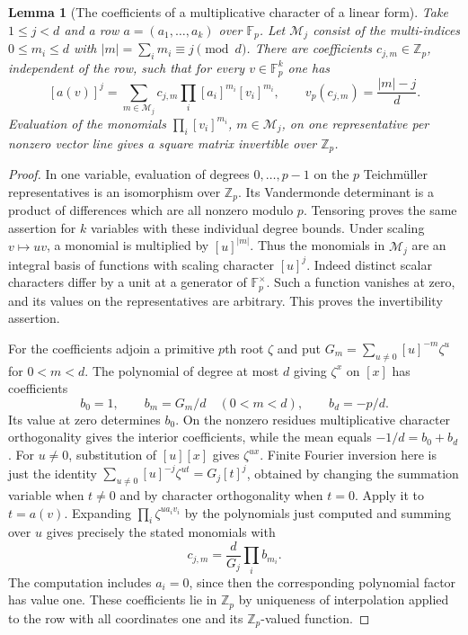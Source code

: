 \documentclass[a4paper,11pt]{article}
\newtheorem{lemma}[proposition]{Lemma}
\theoremstyle{definition}
\theoremstyle{remark}
\newcommand{\ZZ}{\mathbb Z}\newcommand{\ord}{\operatorname{ord}}
\numberwithin{equation}{section}
\begin{document}
\begin{lemma}[The coefficients of a multiplicative character of a linear form]\leavevmode
\label{lem:teichrow400}
Take \(1\le j<d\) and a row \(a=(a_1,\ldots,a_k)\) over
\(\mathbb F_p\). Let \(\mathcal M_j\) consist of the multi-indices
\(0\le m_i\le d\) with \(|m|=\sum_i m_i\equiv j\pmod d\).
There are coefficients \(c_{j,m}\in\ZZ_p\), independent of the row,
such that for every \(v\in\mathbb F_p^k\) one has
\[
    [a(v)]^j=\sum_{m\in\mathcal M_j}c_{j,m}
          \prod_i[a_i]^{m_i}[v_i]^{m_i},\qquad
    v_p(c_{j,m})=\frac{|m|-j}{d}.
\]
Evaluation of the monomials \(\prod_i[v_i]^{m_i}\),
\(m\in\mathcal M_j\), on one representative per nonzero vector
line gives a square matrix invertible over \(\ZZ_p\).
\end{lemma}
\begin{proof}
In one variable, evaluation of degrees \(0,\dots,p-1\) on the
\(p\) Teichm\"uller representatives is an isomorphism over
\(\ZZ_p\). Its Vandermonde determinant is a product of differences
which are all nonzero modulo \(p\). Tensoring proves the same
assertion for \(k\) variables with these individual degree bounds.
Under scaling \(v\mapsto u v\), a monomial is multiplied by
\([u]^{|m|}\). Thus the monomials in \(\mathcal M_j\) are an
integral basis of functions with scaling character \([u]^j\).
Indeed distinct scalar characters differ by a unit at a generator
of \(\mathbb F_p^\times\). Such a function vanishes at zero, and
its values on the representatives are arbitrary. This proves
the invertibility assertion.

For the coefficients adjoin a primitive \(p\)th root \(\zeta\)
and put \(G_m=\sum_{u\ne0}[u]^{-m}\zeta^u\) for \(0<m<d\).
The polynomial of degree at most \(d\) giving \(\zeta^x\) on
\([x]\) has coefficients
\[
  b_0=1,\qquad b_m=G_m/d\quad(0<m<d),\qquad b_d=-p/d .
\]
Its value at zero determines \(b_0\). On the nonzero residues
multiplicative character orthogonality gives the interior
coefficients, while the mean equals \(-1/d=b_0+b_d\).
For \(u\ne0\), substitution of \([u][x]\) gives \(\zeta^{ux}\).
Finite Fourier inversion here is just the identity
\(\sum_{u\ne0}[u]^{-j}\zeta^{ut}=G_j[t]^j\), obtained by
changing the summation variable when \(t\ne0\) and by character
orthogonality when \(t=0\). Apply it to \(t=a(v)\). Expanding
\(\prod_i\zeta^{u a_i v_i}\) by the polynomials just computed
and summing over \(u\) gives precisely the stated monomials with
\[
                 c_{j,m}=\frac{d}{G_j}\prod_i b_{m_i} .
\]
The computation includes \(a_i=0\), since then the corresponding
polynomial factor has value one. These coefficients lie in
\(\ZZ_p\) by uniqueness of interpolation applied to the row with
all coordinates one and its \(\ZZ_p\)-valued function.


\end{proof}
\end{document}
